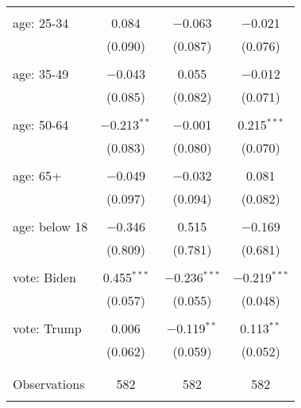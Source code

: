 \begin{tabular}{@{\extracolsep{5pt}}lccc}
  & & & \\ 
 age: 25-34 & 0.084 & $-$0.063 & $-$0.021 \\ 
  & (0.090) & (0.087) & (0.076) \\ 
  & & & \\ 
 age: 35-49 & $-$0.043 & 0.055 & $-$0.012 \\ 
  & (0.085) & (0.082) & (0.071) \\ 
  & & & \\ 
 age: 50-64 & $-$0.213$^{**}$ & $-$0.001 & 0.215$^{***}$ \\ 
  & (0.083) & (0.080) & (0.070) \\ 
  & & & \\ 
 age: 65+ & $-$0.049 & $-$0.032 & 0.081 \\ 
  & (0.097) & (0.094) & (0.082) \\ 
  & & & \\ 
 age: below 18 & $-$0.346 & 0.515 & $-$0.169 \\ 
  & (0.809) & (0.781) & (0.681) \\ 
  & & & \\ 
 vote: Biden & 0.455$^{***}$ & $-$0.236$^{***}$ & $-$0.219$^{***}$ \\ 
  & (0.057) & (0.055) & (0.048) \\ 
  & & & \\ 
 vote: Trump & 0.006 & $-$0.119$^{**}$ & 0.113$^{**}$ \\ 
  & (0.062) & (0.059) & (0.052) \\ 
  & & & \\ 
\hline \\[-1.8ex] 

Observations & 582 & 582 & 582 \\ 
\hline 
\hline \\[-1.8ex] 
\end{tabular} 
